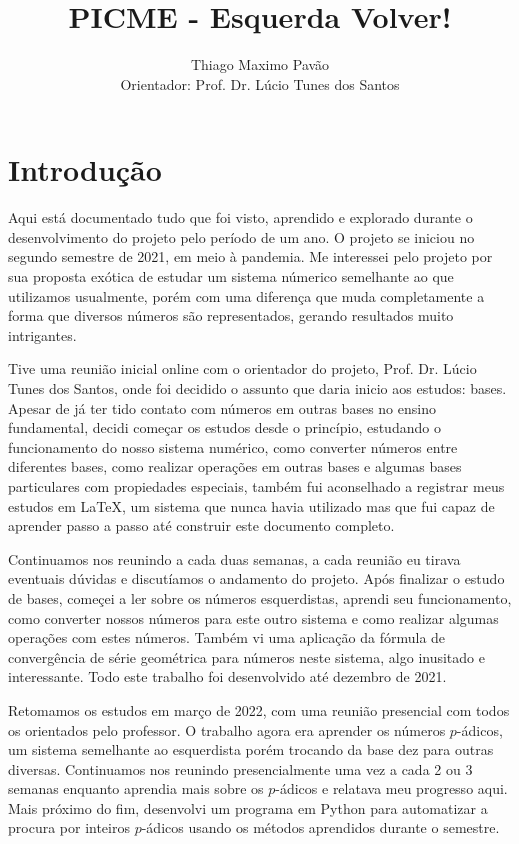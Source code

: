 \documentclass{report}
\title{PICME - Esquerda Volver!}
\author{Thiago Maximo Pavão\\ \small Orientador: Prof. Dr. Lúcio Tunes dos Santos}
\theoremstyle{definition}
\begin{document}
\date{}

\tableofcontents

\chapter*{Introdução}

Aqui está documentado tudo que foi visto, aprendido e explorado durante o desenvolvimento do projeto pelo período de um ano. O projeto se iniciou no segundo semestre de 2021, em meio à pandemia. Me interessei pelo projeto por sua proposta exótica de estudar um sistema númerico semelhante ao que utilizamos usualmente, porém com uma diferença que muda completamente a forma que diversos números são representados, gerando resultados muito intrigantes.

Tive uma reunião inicial online com o orientador do projeto, Prof. Dr. Lúcio Tunes dos Santos, onde foi decidido o assunto que daria inicio aos estudos: bases. Apesar de já ter tido contato com números em outras bases no ensino fundamental, decidi começar os estudos desde o princípio, estudando o funcionamento do nosso sistema numérico, como converter números entre diferentes bases, como realizar operações em outras bases e algumas bases particulares com propiedades especiais, também fui aconselhado a registrar meus estudos em \LaTeX, um sistema que nunca havia utilizado mas que fui capaz de aprender passo a passo até construir este documento completo.

Continuamos nos reunindo a cada duas semanas, a cada reunião eu tirava eventuais dúvidas e discutíamos o andamento do projeto. Após finalizar o estudo de bases, começei a ler sobre os números esquerdistas, aprendi seu funcionamento, como converter nossos números para este outro sistema e como realizar algumas operações com estes números. Também vi uma aplicação da fórmula de convergência de série geométrica para números neste sistema, algo inusitado e interessante. Todo este trabalho foi desenvolvido até dezembro de 2021.

Retomamos os estudos em março de 2022, com uma reunião presencial com todos os orientados pelo professor. O trabalho agora era aprender os números $p$-ádicos, um sistema semelhante ao esquerdista porém trocando da base dez para outras diversas. Continuamos nos reunindo presencialmente uma vez a cada 2 ou 3 semanas enquanto aprendia mais sobre os $p$-ádicos e relatava meu progresso aqui. Mais próximo do fim, desenvolvi um programa em Python para automatizar a procura por inteiros $p$-ádicos usando os métodos aprendidos durante o semestre.
\end{document}
